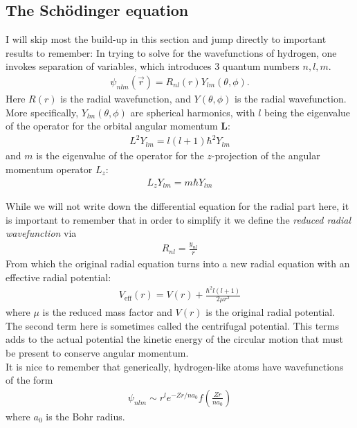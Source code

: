 \documentclass{book}
\theoremstyle{definition}
\newcommand{\f}[2]{\frac{#1}{#2}}
\newcommand{\lp}{\left(}
\newcommand{\rp}{\right)}
\begin{document}
\subsection{The Sch\"{o}dinger equation}

I will skip most the build-up in this section and jump directly to important results to remember: In trying to solve for the wavefunctions of hydrogen, one invokes separation of variables, which introduces 3 quantum numbers $n,l,m$.
\begin{align*}
	\psi_{nlm}(\vec{r}) = R_{nl}(r) Y_{lm}(\theta,\phi).
\end{align*} 
Here $R(r)$ is the radial wavefunction, and $Y(\theta,\phi)$ is the radial wavefunction.\\


More specifically, $Y_{lm}(\theta,\phi)$ are spherical harmonics, with $l$ being the eigenvalue of the operator for the orbital angular momentum $\bm{L}$:
\begin{align*}
	\boxed{L^2 Y_{lm} = l(l+1) \hbar^2 Y_{lm}}
\end{align*}
and $m$ is the eigenvalue of the operator for the $z$-projection of the angular momentum operator $L_z$:
\begin{align*}
	\boxed{L_z Y_{lm} = m\hbar Y_{lm}}
\end{align*} 

While we will not write down the differential equation for the radial part here, it is important to remember that in order to simplify it we define the \textit{reduced radial wavefunction} via 
\begin{align*}
	\boxed{R_{nl} = \f{y_{nl}}{r}}
\end{align*} 
From which the original radial equation turns into a new radial equation with an effective radial potential:
\begin{align*}
	\boxed{V_\text{eff}(r) = V(r) + \f{\hbar^2 l(l+1)}{2\mu r^2}}
\end{align*}
where $\mu$ is the reduced mass factor and $V(r)$ is the original radial potential. The second term here is sometimes called the centrifugal potential. This terms adds to the actual potential the kinetic energy of the circular motion that must be present to conserve angular momentum. \\

It is nice to remember that generically, hydrogen-like atoms have wavefunctions of the form
\begin{align*}
	\psi_{nlm} \sim r^l e^{-Zr/na_0} f\lp \f{Zr}{na_0} \rp
\end{align*}
where $a_0$ is the Bohr radius. \\
\end{document}
